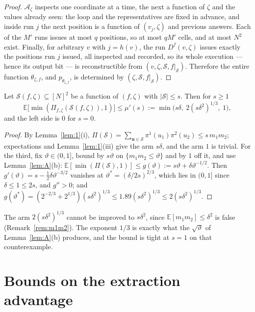 \documentclass{aicr-solution}
\newcommand{\Exp}{\mathbb{E}}
\newcommand{\vu}{\mathbf{u}}
\begin{document}
\begin{proof}
$\mathcal{A}_\zeta$ inspects one coordinate at a time, the next a function of
$\zeta$ and the values already seen: the loop and the representatives are fixed in
advance, and inside run $j$ the next position is a function of $(v_j,\zeta)$ and
previous answers. Each of the $M'$ runs issues at most $q$ positions, so at most
$qM'$ cells, and at most $N^{2}$ exist. Finally, for arbitrary $v$ with
$j = h(v)$, the run $D^{f}(v,\zeta)$ issues exactly the positions run $j$ issued,
all inspected and recorded, so its whole execution --- hence its output bit --- is
reconstructible from $(v,\zeta,\mathcal{S},f|_{\mathcal{S}})$. Therefore the entire
function $\theta_{\zeta,f}$, and $p_{\theta_{\zeta,f}}$, is determined by
$(\zeta,\mathcal{S},f|_{\mathcal{S}})$.
\end{proof}

\begin{lemma}\label{lem:C}
Let $\mathcal{S}(f,\zeta) \subseteq [N]^{2}$ be a function of $(f,\zeta)$ with
$|\mathcal{S}| \le s$. Then for $s \ge 1$
\[
  \Exp\bigl[\min(\Pi_{f,\zeta}(\mathcal{S}(f,\zeta)),1)\bigr] \le
  \mu'(s) := \min\bigl(s\delta,\ 2(s\delta^{2})^{1/3},\ 1\bigr),
\]
and the left side is $0$ for $s = 0$.
\end{lemma}

\begin{proof}
By Lemma~\ref{lem:1}(i),
$\Pi(\mathcal{S}) = \sum_{\vu \in \mathcal{S}} \pi^1(u_1)\pi^2(u_2) \le s\,m_1m_2$;
expectations and Lemma~\ref{lem:1}(iii) give the arm $s\delta$, and the arm $1$ is
trivial. For the third, fix $\vartheta \in (0,1]$, bound by $s\vartheta$ on
$\{m_1m_2 \le \vartheta\}$ and by $1$ off it, and use Lemma~\ref{lem:A}(b):
$\Exp[\min(\Pi(\mathcal{S}),1)] \le g(\vartheta) := s\vartheta + \delta\vartheta^{-1/2}$.
Then $g'(\vartheta) = s - \frac12 \delta\vartheta^{-3/2}$ vanishes at
$\vartheta^{*} = (\delta/2s)^{2/3}$, which lies in $(0,1]$ since
$\delta \le 1 \le 2s$, and $g'' > 0$; and
$g(\vartheta^{*}) = (2^{-2/3} + 2^{1/3})(s\delta^{2})^{1/3}
\le 1.89(s\delta^{2})^{1/3} \le 2(s\delta^{2})^{1/3}$.
\end{proof}

The arm $2(s\delta^{2})^{1/3}$ cannot be improved to $s\delta^{2}$, since
$\Exp[m_1m_2] \le \delta^{2}$ is false (Remark~\ref{rem:m1m2}). The exponent
$1/3$ is exactly what the $\sqrt{\vartheta}$ of Lemma~\ref{lem:A}(b) produces, and
the bound is tight at $s = 1$ on that counterexample.

\section{Bounds on the extraction advantage}\label{sec:extraction}
\end{document}
